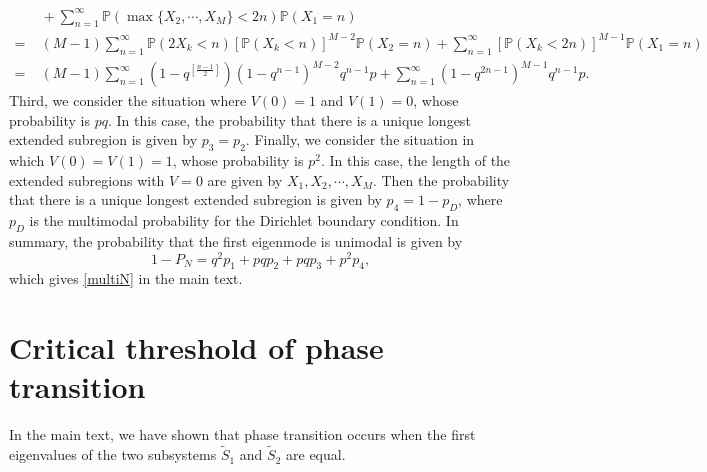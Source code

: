 \documentclass[a4paper,11pt]{article}
\begin{document}
\begin{appendices}
\begin{equation*}
\begin{split}
&\; + \sum_{n=1}^{\infty} \mathbb{P}(\max\{X_2, \cdots, X_M\} < 2 n) \mathbb{P}(X_1 = n) \\
= &\; (M-1) \sum_{n=1}^{\infty} \mathbb{P}(2 X_k < n) [\mathbb{P}(X_k < n)]^{M-2} \mathbb{P}(X_2 = n) + \sum_{n=1}^{\infty} [\mathbb{P}(X_k < 2 n)]^{M-1} \mathbb{P}(X_1 = n) \\
= &\; (M-1) \sum_{n=1}^{\infty} (1 - q^{[\frac{n-1}{2}]}) (1 - q^{n-1})^{M-2} q^{n-1} p + \sum_{n=1}^{\infty} (1 - q^{2n-1})^{M-1} q^{n-1} p.
\end{split}
\end{equation*}
Third, we consider the situation where $V(0) = 1$ and $V(1) = 0$, whose probability is $pq$. In this case, the probability that there is a unique longest extended subregion is given by $p_3 = p_2$. Finally, we consider the situation in which $V(0) = V(1) = 1$, whose probability is $p^2$. In this case, the length of the extended subregions with $V = 0$ are given by $X_1, X_2, \cdots, X_M$. Then the probability that there is a unique longest extended subregion is given by $p_4 = 1-p_D$, where $p_D$ is the multimodal probability for the Dirichlet boundary condition. In summary, the probability that the first eigenmode is unimodal is given by
\begin{equation*}
1-P_N = q^2p_1+pqp_2+pqp_3+p^2p_4,
\end{equation*}
which gives \eqref{multiN} in the main text.


\section{Critical threshold of phase transition}\label{appC}
In the main text, we have shown that phase transition occurs when the first eigenvalues of the two subsystems $\tilde{S}_1$ and $\tilde{S}_2$ are equal.


\end{appendices}
\end{document}
